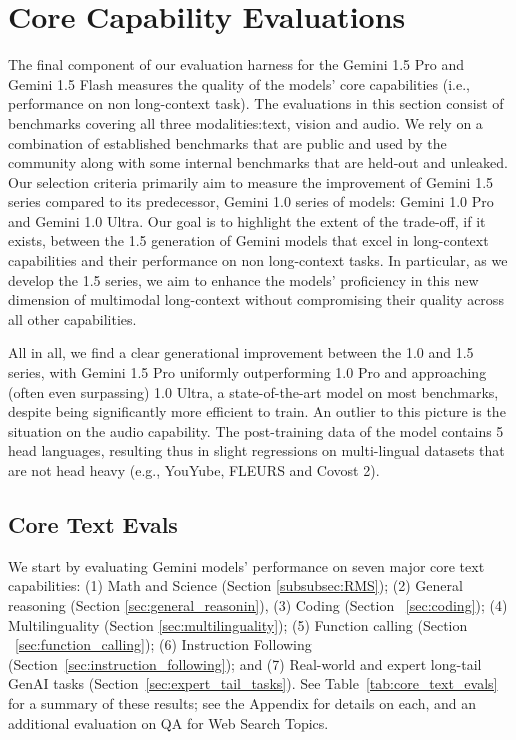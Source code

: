 \section{Core Capability Evaluations}
\label{sec:core-capability}

The final component of our evaluation harness for the Gemini 1.5 Pro  and Gemini 1.5 Flash measures the quality of the models' core capabilities (i.e., performance on non long-context task). The evaluations in this section consist of benchmarks covering all three modalities:text, vision and audio. We rely on a combination of established benchmarks that are public and used by the community along with some internal benchmarks that are held-out and unleaked. Our selection criteria primarily aim to measure the improvement of Gemini 1.5 series compared to its predecessor, Gemini 1.0 series of models: Gemini 1.0 Pro and Gemini 1.0 Ultra. Our goal is to highlight the extent of the trade-off, if it exists, between the 1.5 generation of Gemini models that excel in long-context capabilities and their performance on non long-context tasks. In particular, as we develop the 1.5 series, we aim to enhance the models' proficiency in this new dimension of multimodal long-context without compromising their quality across all other capabilities. 

All in all, we find a clear generational improvement between the 1.0 and 1.5 series, with Gemini 1.5 Pro uniformly outperforming 1.0 Pro and approaching (often even surpassing) 1.0 Ultra, a state-of-the-art model on most benchmarks, despite being significantly more efficient to train. An outlier to this picture is the situation on the audio capability. The post-training data of the model contains 5 head languages, resulting thus in slight regressions on multi-lingual datasets that are not head heavy (e.g.,  YouYube, FLEURS and Covost 2).

\subsection{Core Text Evals}

We start by evaluating  Gemini models' performance on seven major core text capabilities:  (1) Math and Science (Section \ref{subsubsec:RMS}); (2) General reasoning (Section \ref{sec:general_reasonin}), (3) Coding (Section ~\ref{sec:coding}); (4) Multilinguality (Section \ref{sec:multilinguality}); (5) Function calling (Section ~\ref{sec:function_calling}); (6) Instruction Following (Section~\ref{sec:instruction_following}); and (7) Real-world and expert long-tail GenAI tasks (Section~\ref{sec:expert_tail_tasks}).  See Table~\ref{tab:core_text_evals} for a summary of these results; see the Appendix for details on each, and an additional evaluation on QA for Web Search Topics.

